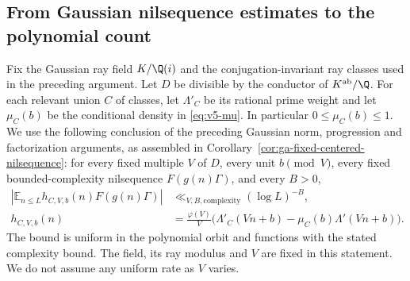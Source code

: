 \subsection{From Gaussian nilsequence estimates to the polynomial count}
\label{subsec:gaussian-gowers-bridge}

Fix the Gaussian ray field $K/\Q(i)$ and the conjugation-invariant ray
classes used in the preceding argument. Let $D$ be divisible by the
conductor of $K^{\rm ab}/\Q$. For each relevant union $C$ of classes,
let $\Lambda'_C$ be its rational prime weight and let $\mu_C(b)$ be the
conditional density in \eqref{eq:v5-mu}. In particular
$0\leq\mu_C(b)\leq1$. We use the following conclusion of the preceding
Gaussian norm, progression and factorization arguments, as assembled in
Corollary~\ref{cor:ga-fixed-centered-nilsequence}: for every fixed
multiple $V$ of $D$, every unit $b\pmod V$, every fixed bounded-complexity
nilsequence $F(g(n)\Gamma)$, and every $B>0$,
\begin{equation}\label{eq:gaussian-centered-nil-input}
\begin{aligned}
 \left|\mathbb E_{n\leq L}h_{C,V,b}(n)F(g(n)\Gamma)\right|
 &\ll_{V,B,\mathrm{complexity}}(\log L)^{-B},\\
 h_{C,V,b}(n)&=\frac{\varphi(V)}V
 \bigl(\Lambda'_C(Vn+b)-\mu_C(b)\Lambda'(Vn+b)\bigr).
\end{aligned}
\end{equation}
The bound is uniform in the polynomial orbit and functions with the stated
complexity bound. The field, its ray modulus and $V$ are fixed in this
statement. We do not assume any uniform rate as $V$ varies.

